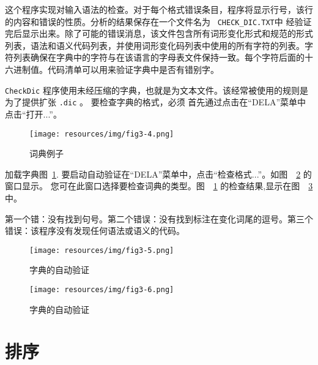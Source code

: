 \bigskip
\noindent 这个程序实现对输入语法的检查。对于每个格式错误条目，程序将显示行号，该行的内容和错误的性质。分析的结果保存在一个文件名为
\ \verb+CHECK_DIC.TXT+中 经验证完后显示出来。除了可能的错误消息，该文件包含所有词形变化形式和规范的形式列表，语法和语义代码列表，并使用词形变化码列表中使用的所有字符的列表。字符列表确保在字典中的字符与在该语言的字母表文件保持一致。每个字符后面的十六进制值。代码清单可以用来验证字典中是否有错别字。


\bigskip
\noindent  \verb+CheckDic+ 程序使用未经压缩的字典，也就是为文本文件。该经常被使用的规则是为了提供扩张
\verb+.dic+ 。 要检查字典的格式，必须
首先通过点击在“DELA”菜单中点击“打开...”。

\begin{figure}[h]
\begin{center}
\texttt{[image: resources/img/fig3-4.png]}
\caption{词典例子\label{fig-dictionary-example}}
\end{center}
\end{figure}

\noindent 加载字典图~\ref{fig-dictionary-example}.
要启动自动验证在“DELA”菜单中，点击“检查格式...”。如图\ ~\ref{fig-dictionary-checking} 的窗口显示。
您可在此窗口选择要检查词典的类型。图\ ~\ref{fig-dictionary-example} 的检查结果,显示在图\ ~\ref{fig-dictionary-checking-results} 中。

\bigskip
\noindent 第一个错：没有找到句号。第二个错误：没有找到标注在变化词尾的逗号。第三个错误：该程序没有发现任何语法或语义的代码。




\begin{figure}[!h]
\begin{center}
\texttt{[image: resources/img/fig3-5.png]}
\caption{字典的自动验证\label{fig-dictionary-checking}}
\end{center}
\end{figure}

\begin{figure}[!p]
\begin{center}
\texttt{[image: resources/img/fig3-6.png]}
\caption{字典的自动验证\label{fig-dictionary-checking-results}}
\end{center}
\end{figure}


\section{排序}

